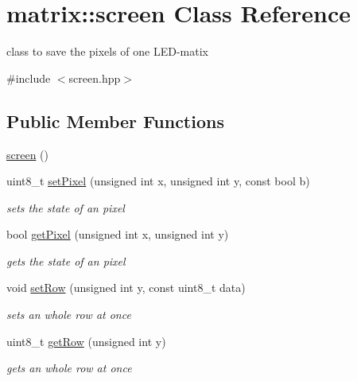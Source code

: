 \hypertarget{classmatrix_1_1screen}{}\section{matrix\+:\+:screen Class Reference}
\label{classmatrix_1_1screen}


class to save the pixels of one L\+E\+D-\/matix  




{\ttfamily \#include $<$screen.\+hpp$>$}

\subsection*{Public Member Functions}
\begin{DoxyCompactItemize}
\item 
\mbox{\hyperlink{classmatrix_1_1screen_af07c83f7aa51a1f7f60abbdf3bd95986}{screen}} ()
\item 
uint8\+\_\+t \mbox{\hyperlink{classmatrix_1_1screen_a5559c58b3ed547d37130db5de06fd4fe}{set\+Pixel}} (unsigned int x, unsigned int y, const bool b)
\begin{DoxyCompactList}\small\item\em sets the state of an pixel \end{DoxyCompactList}\item 
bool \mbox{\hyperlink{classmatrix_1_1screen_a79b2674573b2252b70eaf1f6448f58fd}{get\+Pixel}} (unsigned int x, unsigned int y)
\begin{DoxyCompactList}\small\item\em gets the state of an pixel \end{DoxyCompactList}\item 
void \mbox{\hyperlink{classmatrix_1_1screen_aa4c8480453c02c24d06f28e8891c91ed}{set\+Row}} (unsigned int y, const uint8\+\_\+t data)
\begin{DoxyCompactList}\small\item\em sets an whole row at once \end{DoxyCompactList}\item 
uint8\+\_\+t \mbox{\hyperlink{classmatrix_1_1screen_afead7e5faa463cbcef0b9fb0917be60c}{get\+Row}} (unsigned int y)
\begin{DoxyCompactList}\small\item\em gets an whole row at once \end{DoxyCompactList}\end{DoxyCompactItemize}


